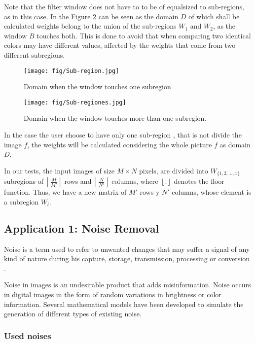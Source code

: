 Note that the filter window does not have to to be of equalsized to sub-regions, as in this case. In the Figure \ref{fig:Sub-regiones} can be seen as the domain $D$ of which shall be calculated weights belong to the union of the sub-regions $W_1$ and $W_2$, as the window $B$ touches both. This is done to avoid that when comparing two identical colors may have different values, affected by the weights that come from two different subregions.  


\begin{figure}
	\centering
		\texttt{[image: fig/Sub-region.jpg]}
	\caption{Domain when the window touches one subregion}
	\label{fig:Sub-region}
\end{figure}




\begin{figure}
	\centering
		\texttt{[image: fig/Sub-regiones.jpg]}
	\caption{Domain when the window touches more than one subregion.}
	\label{fig:Sub-regiones}
\end{figure} In the case the user choose to have only one sub-region , that is not divide the image $f$, the weights will be calculated considering the whole picture $f$ as domain $D$.


In our tests, the input images of size $M \times N$ pixels, are divided into  $W_{\{1,2,...,x\}}$ subregions of $\left\lfloor\frac{M}{M'}\right\rfloor$ rows and $\left\lfloor\frac{N}{N'}\right\rfloor$ columns, where $\left\lfloor.\right\rfloor$ denotes the floor function. Thus, we have a new matrix of $M'$ rows y $N'$ columns, whose element is a subregion $W_l$.



\subsection{Application 1: Noise Removal}
Noise is a term used to refer to unwanted changes that may suffer a signal of any kind of nature during his capture, storage, transmission, processing or conversion \cite{tuzlukov2002signal}.

Noise in images is an undesirable product that adds misinformation. Noise occurs in digital images in the form of random variations in brightness or color information. 
Several mathematical models have been developed to simulate the generation of different types of existing noise. 

\subsubsection{Used noises} 

